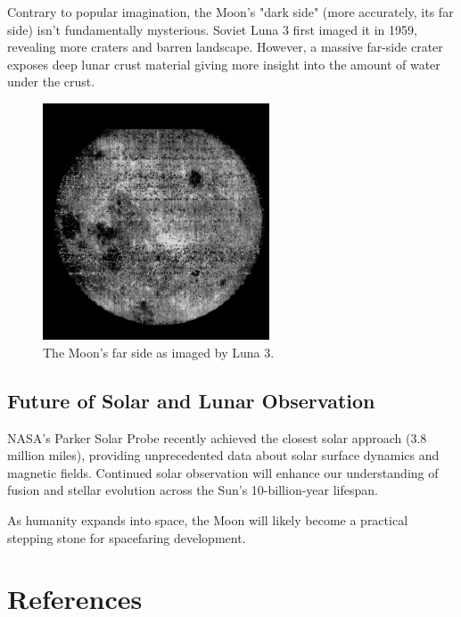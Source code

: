 \documentclass[12pt,oneside,a4paper,english]{article}
\begin{document}
Contrary to popular imagination, the Moon's "dark side" (more accurately, its far side) isn't fundamentally mysterious. Soviet Luna 3 first imaged it in 1959, revealing more craters and barren landscape. However, a massive far-side crater exposes deep lunar crust material giving more insight into the amount of water under the crust.\cite{darkmoon}

\begin{figure}[H]
    \centering
    \includegraphics[width=0.6\textwidth]{DarkMoon.jpg}
    \caption{The Moon's far side as imaged by Luna 3.\cite{darkmoon}}
    \label{fig:darkmoon}
\end{figure}

\subsection{Future of Solar and Lunar Observation}
NASA's Parker Solar Probe recently achieved the closest solar approach (3.8 million miles), providing unprecedented data about solar surface dynamics and magnetic fields. Continued solar observation will enhance our understanding of fusion and stellar evolution across the Sun's 10-billion-year lifespan.

As humanity expands into space, the Moon will likely become a practical stepping stone for spacefaring development.

\newpage
\section{References}


\end{document}
